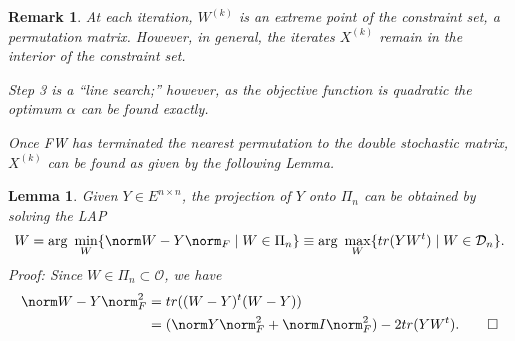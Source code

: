 \documentclass{amsart}
\theoremstyle{plain} \newtheorem{Exa}{Example}[section]
\newtheorem{Rem}{Remark}[section]
\newtheorem{Lem}{Lemma}[section]
\newtheorem{Def}{Definition}[section]
\begin{document}
\begin{Rem}
\item At each iteration, $W^{(k)}$ is an extreme point of the
constraint set, a permutation matrix.
However, in general, the iterates $X^{(k)}$ remain in the
interior of the constraint set.
\item Step 3 is a ``line search;'' however, as the objective function is quadratic
the optimum $\alpha$ can be found exactly.
\item Once FW has terminated the nearest permutation to the double stochastic matrix, $X^{(k)}$ can be found as given by the following Lemma.
\end{Rem}
%

\begin{Lem}
  Given $Y \in E^{n \times n}$, the projection of $Y$ onto $\Pi_n$ can
  be obtained by solving the  LAP
  $$
  W={\text{\rm arg }} \min_W \lbrace { \norm W-Y \norm_F \mid W \in
    \Pi_n }\rbrace \equiv {\text{\rm arg }} \max_W \lbrace{ tr(YW^t)
    \mid W \in \mathcal D_n }\rbrace .
  $$
  Proof: Since $W \in \Pi_n \subset \mathcal O$, we have
  $$
  \aligned
  \norm W-Y \norm_F^2 &= tr( (W-Y)^t (W-Y)) \\
  &= (\norm Y \norm_F^2 + \norm I \norm_F^2) - 2tr( Y W^t ). \qed
  \endaligned
  $$
\end{Lem}
\end{document}
